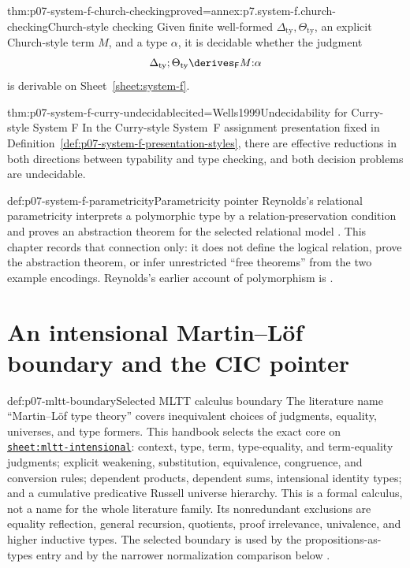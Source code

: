\begin{hbtheorem}{thm:p07-system-f-church-checking}{proved=annex:p7.system-f.church-checking}{Church-style checking}
Given finite well-formed \(\Delta_{\mathrm{ty}},\Theta_{\mathrm{ty}}\), an
explicit Church-style term \(M\), and a type \(\alpha\), it is decidable
whether the judgment
\[
 \Delta_{\mathrm{ty}};\Theta_{\mathrm{ty}}
 \derives_{\mathsf F}M{:}\alpha
\]
is derivable on Sheet~\ref{sheet:system-f}.
\end{hbtheorem}

\begin{hbtheorem}{thm:p07-system-f-curry-undecidable}{cited=Wells1999}{Undecidability for Curry-style System F}
In the Curry-style System~F assignment presentation fixed in
Definition~\ref{def:p07-system-f-presentation-styles}, there are effective
reductions in both directions between typability and type checking, and both
decision problems are undecidable.
\end{hbtheorem}

\begin{proofboundary}{def:p07-system-f-parametricity}{Parametricity pointer}
Reynolds's relational parametricity interprets a polymorphic type by a
relation-preservation condition and proves an abstraction theorem for the
selected relational model \cite{Reynolds1983}.  This chapter records that
connection only: it does not define the logical relation, prove the
abstraction theorem, or infer unrestricted ``free theorems'' from the two
example encodings.  Reynolds's earlier account of polymorphism is
\cite{Reynolds1974}.
\end{proofboundary}

\section[Intensional type theory]{An intensional Martin--L\"of boundary and the CIC pointer}

\begin{proofboundary}{def:p07-mltt-boundary}{Selected MLTT calculus boundary}
The literature name ``Martin--L\"of type theory'' covers inequivalent choices
of judgments, equality, universes, and type formers. This handbook selects the
exact core on \hyperref[sheet:mltt-intensional]{\texttt{sheet:mltt-intensional}}:
context, type, term, type-equality, and term-equality judgments; explicit
weakening, substitution, equivalence, congruence, and conversion rules;
dependent products, dependent sums, intensional identity types; and a
cumulative predicative Russell universe hierarchy. This is a formal calculus,
not a name for the whole literature family. Its nonredundant exclusions are
equality reflection, general recursion, quotients, proof irrelevance,
univalence, and higher inductive types. The selected boundary is used by the
propositions-as-types entry and by the narrower normalization comparison below
\cite{MartinLof1984,NordstromPeterssonSmith1990,Hofmann1997}.
\end{proofboundary}

